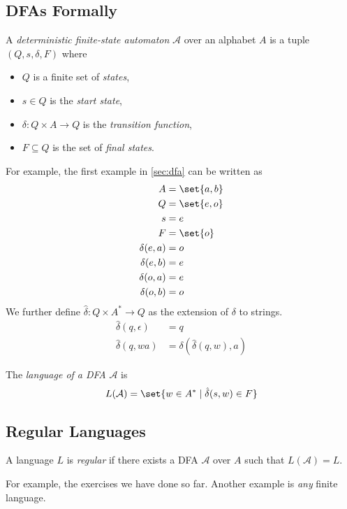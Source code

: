 \subsection{DFAs Formally} \label{sec:dfa:formal}
\begin{definition}[DFA] \label{def:dfa}
    A \emph{deterministic finite-state automaton} $\mathcal{A}$ over an
    alphabet $A$ is a tuple $(Q, s, \delta, F)$ where
    \begin{itemize}
        \item $Q$ is a finite set of \emph{states},
        \item $s \in Q$ is the \emph{start state},
        \item $\delta: Q \times A \to Q$ is the \emph{transition function},
        \item $F \subseteq Q$ is the set of \emph{final states}.
    \end{itemize}
\end{definition}
For example, the first example in \cref{sec:dfa} can be written as
\begin{align*}
    A &= \set{a, b} \\
    Q &= \set{e, o} \\
    s &= e \\
    F &= \set{o} \\
    \delta(e, a) &= o \\
    \delta(e, b) &= e \\
    \delta(o, a) &= e \\
    \delta(o, b) &= o
\end{align*}
We further define $\hat{\delta} : Q \times A^* \to Q$ as the extension of
$\delta$ to strings.
\begin{align*}
    \hat{\delta}(q, \epsilon) &= q \\
    \hat{\delta}(q, wa) &= \delta(\hat{\delta}(q, w), a)
\end{align*}
\begin{definition} \label{def:dfa:lang}
    The \emph{language of a DFA} $\mathcal{A}$ is
    \begin{equation*}
        L(\mathcal{A}) = \set{w \in A^* \mid \hat{\delta}(s, w) \in F}
    \end{equation*}
\end{definition}

\subsection{Regular Languages} \label{sec:dfa:regular}
\begin{definition} \label{def:regular}
    A language $L$ is \emph{regular} if there exists a DFA $\mathcal{A}$
    over $A$ such that $L(\mathcal{A}) = L$.
\end{definition}
For example, the exercises we have done so far.
Another example is \emph{any} finite language.

